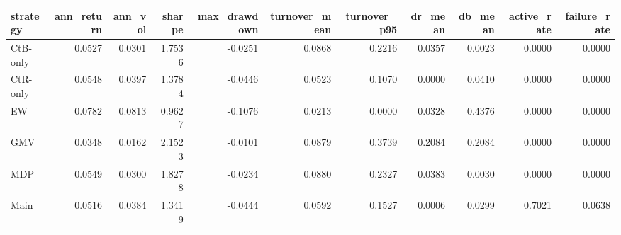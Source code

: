 \begin{tabular}{lrrrrrrrrrr}
\toprule
strategy & ann_return & ann_vol & sharpe & max_drawdown & turnover_mean & turnover_p95 & dr_mean & db_mean & active_rate & failure_rate \\
\midrule
CtB-only & 0.0527 & 0.0301 & 1.7536 & -0.0251 & 0.0868 & 0.2216 & 0.0357 & 0.0023 & 0.0000 & 0.0000 \\
CtR-only & 0.0548 & 0.0397 & 1.3784 & -0.0446 & 0.0523 & 0.1070 & 0.0000 & 0.0410 & 0.0000 & 0.0000 \\
EW & 0.0782 & 0.0813 & 0.9627 & -0.1076 & 0.0213 & 0.0000 & 0.0328 & 0.4376 & 0.0000 & 0.0000 \\
GMV & 0.0348 & 0.0162 & 2.1523 & -0.0101 & 0.0879 & 0.3739 & 0.2084 & 0.2084 & 0.0000 & 0.0000 \\
MDP & 0.0549 & 0.0300 & 1.8278 & -0.0234 & 0.0880 & 0.2327 & 0.0383 & 0.0030 & 0.0000 & 0.0000 \\
Main & 0.0516 & 0.0384 & 1.3419 & -0.0444 & 0.0592 & 0.1527 & 0.0006 & 0.0299 & 0.7021 & 0.0638 \\
\bottomrule
\end{tabular}
